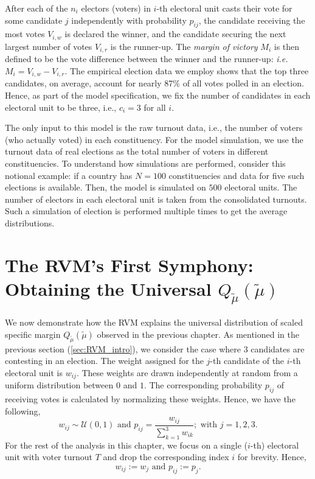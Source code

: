 After each of the $n_i$ electors (voters) in $i$-th electoral unit casts their vote for some candidate $j$ independently with probability $p_{ij}$, the candidate receiving the most votes $V_{i, w}$ is declared the winner, and the candidate securing the next largest number of votes $V_{i, r}$ is the runner-up. The \emph{margin of victory} $M_i$ is then defined to be the vote difference between the winner and the runner-up: \emph{i.e.} $M_i = V_{i, w} - V_{i, r}$. The empirical election data we employ shows that the top three candidates, on average, account for nearly 87\% of all votes polled in an election.
Hence, as part of the model specification, we fix the number of candidates in each electoral unit to be three, i.e., $c_i = 3$ for all $i$.

The only input to this model is the raw turnout data, i.e., the number of voters (who actually voted) in each constituency. For the model simulation, we use the turnout data of real elections as the total number of voters in different constituencies. To understand how simulations are performed, consider this notional example: if a country has $N=100$ constituencies and data for five such elections is available. Then, the model is simulated on $500$ electoral units. The number of electors in each electoral unit is taken from the consolidated turnouts. Such a simulation of election is performed multiple times to get the average distributions.
\section{The RVM's First Symphony: Obtaining the Universal $Q_{\widetilde{\mu}}\left(\widetilde{\mu}\right)$}
\label{sec:RVM_first_symphony}
We now demonstrate how the RVM explains the universal distribution of scaled specific margin $Q_{\widetilde{\mu}}\left(\widetilde{\mu}\right)$ observed in the previous chapter. As mentioned in the previous section (\ref{sec:RVM_intro}), we consider the case where $3$ candidates are contesting in an election. The weight assigned for the $j$-th candidate of the $i$-th electoral unit is $w_{ij}$. These weights are drawn independently at random from a uniform distribution between $0$ and $1$.  The corresponding probability $p_{ij}$ of receiving votes is calculated by normalizing these weights. Hence, we have the following,
\begin{equation}
    w_{ij} \sim \mathcal{U}(0, 1) \text{ and } p_{ij} = \frac{w_{ij}}{\sum_{k=1}^3 w_{ik}}; \text{ with } j = 1, 2, 3.
\end{equation}
For the rest of the analysis in this chapter, we focus on a single ($i$-th) electoral unit with voter turnout $T$ and drop the corresponding index $i$ for brevity. Hence,
\begin{equation}
    w_{ij} := w_j \text{ and } p_{ij} := p_j.
\end{equation}
